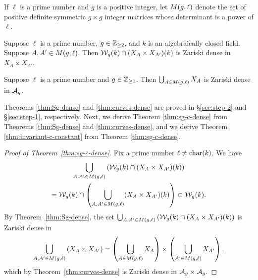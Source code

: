 \documentclass{amsart}
\begin{document}
\begin{definition}\label{def:detl}
If $\ell$ is a prime number and $g$ is a positive integer, let $M(g,\ell)$ denote the set of positive definite symmetric $g \times g$ integer matrices whose determinant is a power of $\ell$.
\end{definition}

\begin{theorem}\label{thm:Sg-dense}
  Suppose $\ell$ is a prime number, $g\in\mathbb{Z}_{\ge 2}$, and $k$ is an algebraically closed field. Suppose $A,A' \in M(g,\ell)$. Then $\mathcal{W}_g(k) \cap (X_A \times X_{A'})(k)$ is Zariski dense in $X_A \times X_{A'}$.
\end{theorem}

\begin{theorem}\label{thm:curves-dense}
    Suppose $\ell$ is a prime number and $g\in\mathbb{Z}_{\ge 1}$. Then $\bigcup_{A \in M(g,\ell)} X_A$ is Zariski dense in $\mathcal{A}_g$.
\end{theorem}

Theorems \ref{thm:Sg-dense} and \ref{thm:curves-dense} are proved in \S\ref{sec:step-2} and \S\ref{sec:step-1}, respectively. Next, we derive Theorem \ref{thm:sg-c-dense} from Theorems \ref{thm:Sg-dense} and \ref{thm:curves-dense}, and we derive Theorem \ref{thm:invariant-c-constant} from Theorem \ref{thm:sg-c-dense}.

\begin{proof}[Proof of Theorem~\ref{thm:sg-c-dense}]
Fix a prime number $\ell\neq\operatorname{char}(k)$. We have
\begin{multline*}
\bigcup_{A,A' \in M(g,\ell)} \left(\mathcal{W}_g(k) \cap (X_A \times X_{A'})(k)\right) \\
 =  \mathcal{W}_g(k) \cap \left(\bigcup_{A,A' \in M(g,\ell)} (X_A \times X_{A'})(k)\right)
   \subset \mathcal{W}_g(k).
\end{multline*}
By Theorem~\ref{thm:Sg-dense}, the set
$\bigcup_{A,A' \in M(g,\ell)} \left(\mathcal{W}_g(k) \cap (X_A \times X_{A'})(k)\right)$ is Zariski dense in
$$
\bigcup_{A,A' \in M(g,\ell)} \left(X_A \times X_{A'}\right) =
    \left(\bigcup_{A \in M(g,\ell)} X_A\right) \times \left(\bigcup_{A' \in M(g,\ell)} X_{A'}\right),
    $$
    which by Theorem~\ref{thm:curves-dense} is Zariski dense in $\mathcal{A}_g \times \mathcal{A}_g$.
\end{proof}
\end{document}
